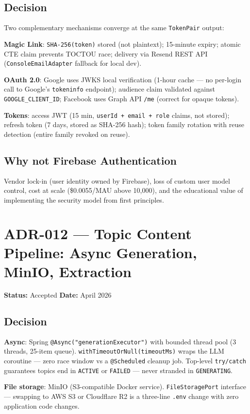 \subsection*{Decision}
Two complementary mechanisms converge at the same \texttt{TokenPair} output:

\textbf{Magic Link}: \texttt{SHA-256(token)} stored (not plaintext); 15-minute expiry; atomic CTE claim prevents TOCTOU race; delivery via Resend REST API (\texttt{ConsoleEmailAdapter} fallback for local dev).

\textbf{OAuth 2.0}: Google uses JWKS local verification (1-hour cache — no per-login call to Google's \texttt{tokeninfo} endpoint); audience claim validated against \texttt{GOOGLE\_CLIENT\_ID}; Facebook uses Graph API \texttt{/me} (correct for opaque tokens).

\textbf{Tokens}: access JWT (15 min, \texttt{userId + email + role} claims, not stored); refresh token (7 days, stored as SHA-256 hash); token family rotation with reuse detection (entire family revoked on reuse).

\subsection*{Why not Firebase Authentication}
Vendor lock-in (user identity owned by Firebase), loss of custom user model control, cost at scale (\$0.0055/MAU above 10,000), and the educational value of implementing the security model from first principles.

\section{ADR-012 — Topic Content Pipeline: Async Generation, MinIO, Extraction}
\label{adr:012}
\textbf{Status:} Accepted \quad \textbf{Date:} April 2026

\subsection*{Decision}
\textbf{Async}: Spring \texttt{@Async("generationExecutor")} with bounded thread pool (3 threads, 25-item queue). \texttt{withTimeoutOrNull(timeoutMs)} wraps the LLM coroutine — zero race window vs a \texttt{@Scheduled} cleanup job. Top-level \texttt{try/catch} guarantees topics end in \texttt{ACTIVE} or \texttt{FAILED} — never stranded in \texttt{GENERATING}.

\textbf{File storage}: MinIO (S3-compatible Docker service). \texttt{FileStoragePort} interface — swapping to AWS S3 or Cloudflare R2 is a three-line \texttt{.env} change with zero application code changes.

